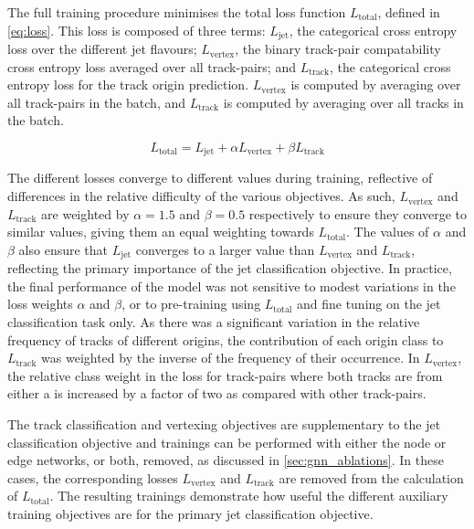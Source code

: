 The full \GNN training procedure minimises the total loss function $L_\text{total}$, defined in \cref{eq:loss}. 
This loss is composed of three terms: $L_\text{jet}$, the categorical cross entropy loss over the different jet flavours; $L_\text{vertex}$, the binary track-pair compatability cross entropy loss averaged over all track-pairs; and $L_\text{track}$, the categorical cross entropy loss for the track origin prediction. $L_\text{vertex}$ is computed by averaging over all track-pairs in the batch, and $L_\text{track}$ is computed by averaging over all tracks in the batch.

\begin{equation}\label{eq:loss}
    L_\text{total} = L_\text{jet} + \alpha L_\text{vertex} + \beta L_\text{track}
\end{equation}

The different losses converge to different values during training, reflective of differences in the relative difficulty of the various objectives.
As such, $L_\text{vertex}$ and $L_\text{track}$ are weighted by $\alpha = 1.5$ and $\beta = 0.5$ respectively to ensure they converge to similar values, giving them an equal weighting towards $L_\text{total}$. 
The values of $\alpha$ and $\beta$ also ensure that $L_\text{jet}$ converges to a larger value than $L_\text{vertex}$ and $L_\text{track}$, reflecting the primary importance of the jet classification objective.
In practice, the final performance of the model was not sensitive to modest variations in the loss weights $\alpha$ and $\beta$, or to pre-training using $L_\text{total}$ and fine tuning on the jet classification task only.
As there was a significant variation in the relative frequency of tracks of different origins, the contribution of each origin class to $L_\text{track}$ was weighted by the inverse of the frequency of their occurrence.
In $L_\text{vertex}$, the relative class weight in the loss for track-pairs where both tracks are from either a \borchadron is increased by a factor of two as compared with other track-pairs.

The track classification and vertexing objectives are supplementary to the jet classification objective and trainings can be performed with either the node or edge networks, or both, removed, as discussed in \cref{sec:gnn_ablations}.
In these cases, the corresponding losses $L_\text{vertex}$ and $L_\text{track}$ are removed from the calculation of $L_\text{total}$. 
The resulting trainings demonstrate how useful the different auxiliary training objectives are for the primary jet classification objective.

